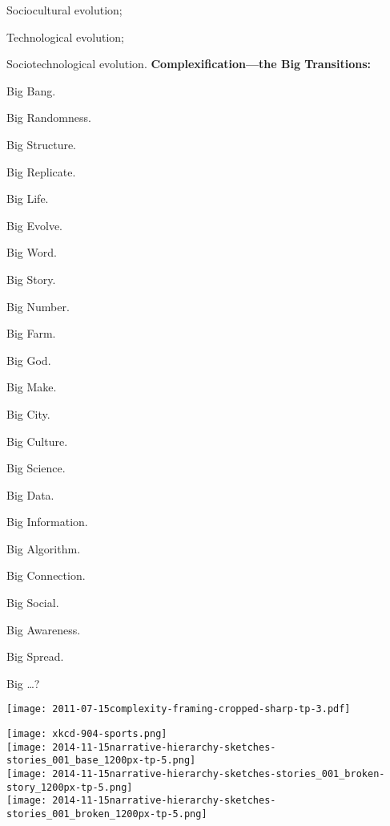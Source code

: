       Sociocultural evolution;
     
      Technological evolution;
     
      Sociotechnological evolution.
  \textbf{Complexification---the Big Transitions:}
  
    
      Big Bang.
     
      Big Randomness.
     
      Big Structure.
     
      Big Replicate.
     
      Big Life.
     
      Big Evolve.
    
     
      Big Word.
     
      Big Story.
     
      Big Number.
     
      Big Farm.
     
      Big God.
     
      Big Make.
     
      Big City.
     
      Big Culture.
    
    
      Big Science.
     
      Big Data.
     
      Big Information.
     
      Big Algorithm.
     
      Big Connection.
     
      Big Social.
     
      Big Awareness.
     
      Big Spread.
    
      Big \ldots ?
  

  \texttt{[image: 2011-07-15complexity-framing-cropped-sharp-tp-3.pdf]}
  \small
    
      \texttt{[image: xkcd-904-sports.png]}\\
      {\tiny
      }
      \texttt{[image: 2014-11-15narrative-hierarchy-sketches-stories\_001\_base\_1200px-tp-5.png]}\\
      \texttt{[image: 2014-11-15narrative-hierarchy-sketches-stories\_001\_broken-story\_1200px-tp-5.png]}\\
      \texttt{[image: 2014-11-15narrative-hierarchy-sketches-stories\_001\_broken\_1200px-tp-5.png]}\\
      
